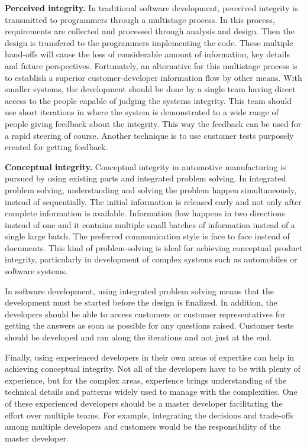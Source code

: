 \textbf{Perceived integrity.} In traditional software development, perceived integrity is transmitted to programmers through a multistage process. In this process, requirements are collected and processed through analysis and design. Then the design is transfered to the programmers implementing the code. These multiple hand-offs will cause the loss of considerable amount of information, key details and future perspectives. Fortunately, an alternative for this multistage process is to establish a superior customer-developer information flow by other means. With smaller systems, the development should be done by a single team having direct access to the people capable of judging the systems integrity. This team should use short iterations in where the system is demonstrated to a wide range of people giving feedback about the integrity. This way the feedback can be used for a rapid steering of course. Another technique is to use customer tests purposely created for getting feedback.

\textbf{Conceptual integrity.}
Conceptual integrity in automotive manufacturing is pursued by using existing parts and integrated problem solving. In integrated problem solving, understanding and solving the problem happen simultaneously, instead of sequentially. The initial information is released early and not only after complete information is available. Information flow happens in two directions instead of one and it contains multiple small batches of information instead of a single large batch. The preferred communication style is face to face instead of documents. This kind of problem-solving is ideal for achieving conceptual product integrity, particularly in development of complex systems such as automobiles or software systems.

In software development, using integrated problem solving means that the development must be started before the design is finalized. In addition, the developers should be able to access customers or customer representatives for getting the answers as soon as possible for any questions raised. Customer tests should be developed and ran along the iterations and not just at the end.

Finally, using experienced developers in their own areas of expertise can help in achieving conceptual integrity. Not all of the developers have to be with plenty of experience, but for the complex areas, experience brings understanding of the technical details and patterns widely used to manage with the complexities. One of these experienced developers should be a master developer facilitating the effort over multiple teams. For example, integrating the decisions and trade-offs among multiple developers and customers would be the responsibility of the master developer.

